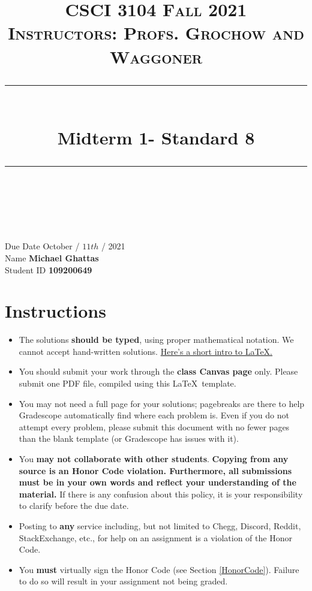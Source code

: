 \documentclass[11pt]{article}
\title{
\normalfont \normalsize 
\textsc{CSCI 3104 Fall 2021 \\ 
Instructors: Profs. Grochow and Waggoner} \\
[10pt] 
\rule{\linewidth}{0.5pt} \\[6pt] 
\huge Midterm 1- Standard 8 \\
\rule{\linewidth}{2pt}  \\[10pt]
}
\date{}
\theoremstyle{definition}
\theoremstyle{definition}
\theoremstyle{definition}
\begin{document}

\maketitle


\noindent
Due Date \dotfill October / $11{th}$ / 2021 \\
Name \dotfill \textbf{Michael Ghattas} \\
Student ID \dotfill \textbf{109200649} \\


\tableofcontents

\section{Instructions}
 \begin{itemize}
	\item The solutions \textbf{should be typed}, using proper mathematical notation. We cannot accept hand-written solutions. \href{http://ece.uprm.edu/~caceros/latex/introduction.pdf}{Here's a short intro to \LaTeX.}
	\item You should submit your work through the \textbf{class Canvas page} only. Please submit one PDF file, compiled using this \LaTeX \ template.
	\item You may not need a full page for your solutions; pagebreaks are there to help Gradescope automatically find where each problem is. Even if you do not attempt every problem, please submit this document with no fewer pages than the blank template (or Gradescope has issues with it).

	\item You \textbf{may not collaborate with other students}. \textbf{Copying from any source is an Honor Code violation. Furthermore, all submissions must be in your own words and reflect your understanding of the material.} If there is any confusion about this policy, it is your responsibility to clarify before the due date. 

	\item Posting to \textbf{any} service including, but not limited to Chegg, Discord, Reddit, StackExchange, etc., for help on an assignment is a violation of the Honor Code.

	\item You \textbf{must} virtually sign the Honor Code (see Section \ref{HonorCode}). Failure to do so will result in your assignment not being graded.
\end{itemize}
\end{document}
